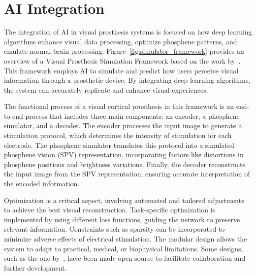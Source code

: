 \documentclass[twocolumn,10pt]{article}
\begin{document}
\section*{AI Integration}\label{sec:ai_integration}
The integration of AI in visual prosthesis systems is focused on how deep
learning algorithms enhance visual data processing, optimize phosphene patterns,
and emulate normal brain processing. Figure~\ref{fig:simulator_framework}
provides an overview of a Visual Prosthesis Simulation Framework based on the
work by~\textcite{deruytervansteveninckEndtoendOptimizationProsthetic2022}. This
framework employs AI to simulate and predict how users perceive visual
information through a prosthetic device. By integrating deep learning
algorithms, the system can accurately replicate and enhance visual experiences.

The functional process of a visual cortical prosthesis in this framework is an
end-to-end process that includes three main components: an encoder, a phosphene
simulator, and a decoder. The encoder processes the input image to generate a
stimulation protocol, which determines the intensity of stimulation for each
electrode. The phosphene simulator translates this protocol into a simulated
phosphene vision (SPV) representation, incorporating factors like distortions in
phosphene positions and brightness variations. Finally, the decoder reconstructs
the input image from the SPV representation, ensuring accurate interpretation of
the encoded information.

Optimization is a critical aspect, involving automated and tailored adjustments
to achieve the best visual reconstruction. Task-specific optimization is
implemented by using different loss functions, guiding the network to preserve
relevant information. Constraints such as sparsity can be incorporated to
minimize adverse effects of electrical stimulation. The modular design allows
the system to adapt to practical, medical, or biophysical limitations. Some
designs, such as the one
by~\textcite{deruytervansteveninckEndtoendOptimizationProsthetic2022}, have been
made open-source to facilitate collaboration and further development.
\end{document}
